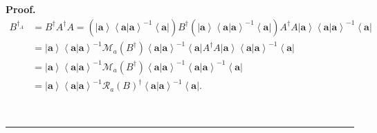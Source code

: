 \documentclass[aps,preprint]{revtex4}%
\newenvironment{proof}[1][Proof]{\noindent\textbf{#1.} }{\ \rule{0.5em}{0.5em}}
\begin{document}
\begin{proof}%
\begin{align}
B^{\dagger_{A}}  &  =B^{\dagger}A^{\dagger}A=\left(  \left\vert \mathbf{a}%
\right\rangle \left\langle \left.  \mathbf{a}\right\vert \mathbf{a}%
\right\rangle ^{-1}\left\langle \mathbf{a}\right\vert \right)  B^{\dagger
}\left(  \left\vert \mathbf{a}\right\rangle \left\langle \left.
\mathbf{a}\right\vert \mathbf{a}\right\rangle ^{-1}\left\langle \mathbf{a}%
\right\vert \right)  A^{\dagger}A\left\vert \mathbf{a}\right\rangle
\left\langle \left.  \mathbf{a}\right\vert \mathbf{a}\right\rangle
^{-1}\left\langle \mathbf{a}\right\vert \\
&  =\left\vert \mathbf{a}\right\rangle \left\langle \left.  \mathbf{a}%
\right\vert \mathbf{a}\right\rangle ^{-1}\mathcal{M}_{a}\left(  B^{\dagger
}\right)  \left\langle \left.  \mathbf{a}\right\vert \mathbf{a}\right\rangle
^{-1}\left\langle \mathbf{a}\right\vert A^{\dagger}A\left\vert \mathbf{a}%
\right\rangle \left\langle \left.  \mathbf{a}\right\vert \mathbf{a}%
\right\rangle ^{-1}\left\langle \mathbf{a}\right\vert \\
&  =\left\vert \mathbf{a}\right\rangle \left\langle \left.  \mathbf{a}%
\right\vert \mathbf{a}\right\rangle ^{-1}\mathcal{M}_{a}\left(  B^{\dagger
}\right)  \left\langle \left.  \mathbf{a}\right\vert \mathbf{a}\right\rangle
^{-1}\left\langle \left.  \mathbf{a}\right\vert \mathbf{a}\right\rangle
^{-1}\left\langle \mathbf{a}\right\vert \\
&  =\left\vert \mathbf{a}\right\rangle \left\langle \left.  \mathbf{a}%
\right\vert \mathbf{a}\right\rangle ^{-1}\mathcal{R}_{a}\left(  B\right)
^{\dagger}\left\langle \left.  \mathbf{a}\right\vert \mathbf{a}\right\rangle
^{-1}\left\langle \mathbf{a}\right\vert .
\end{align}

\end{proof}
\end{document}
